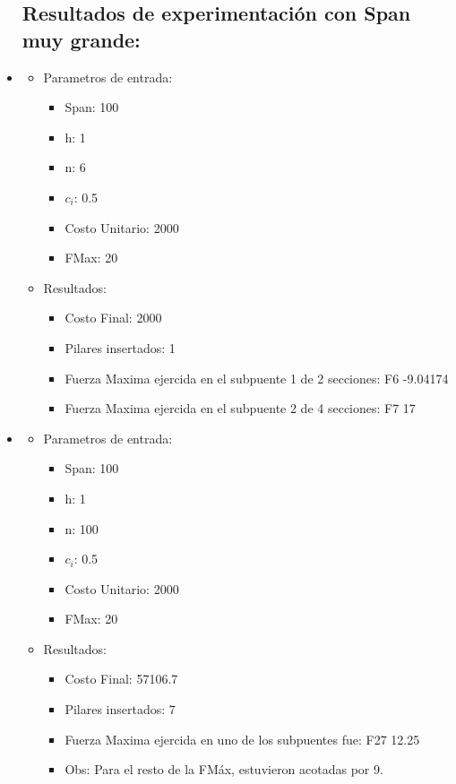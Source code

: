 \begin{itemize}
\subsection{Resultados de experimentaci\'on con Span muy grande:}
\item
  \begin{itemize}
    \item Parametros de entrada:
	  \begin{itemize}
	    \item Span: 100
	    \item h: 1
	    \item n: 6
	    \item $c_i$: 0.5
	    \item Costo Unitario: 2000
	    \item FMax: 20
	  \end{itemize}
      \item Resultados:
	  \begin{itemize}
	    \item Costo Final: 2000
	    \item Pilares insertados: 1
	    \item Fuerza Maxima ejercida en el subpuente 1 de 2 secciones: F6 -9.04174
	    \item Fuerza Maxima ejercida en el subpuente 2 de 4 secciones: F7 17
	  \end{itemize}
      \end{itemize}
\item
  \begin{itemize}
    \item Parametros de entrada:
	  \begin{itemize}
	    \item Span: 100
	    \item h: 1
	    \item n: 100
	    \item $c_i$: 0.5
	    \item Costo Unitario: 2000
	    \item FMax: 20
	  \end{itemize}
      \item Resultados:
	  \begin{itemize}
	    \item Costo Final: 57106.7
	    \item Pilares insertados: 7
	    \item Fuerza Maxima ejercida en uno de los subpuentes fue: F27 12.25
	    \item Obs: Para el resto de la FM\'ax, estuvieron acotadas por 9.

\end{itemize}
\end{itemize}
\end{itemize}
